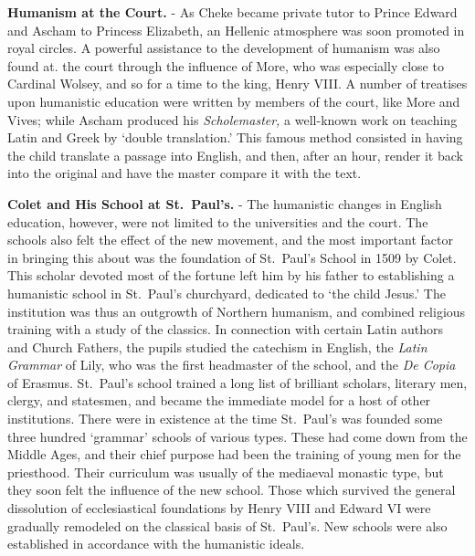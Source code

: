 \documentclass[
]{book}
\begin{document}
\textbf{Humanism at the Court.} - As Cheke became private tutor to Prince Edward and Ascham to Princess Elizabeth, an Hellenic atmosphere was soon promoted in royal circles. A powerful assistance to the development of humanism was also found at. the court through the influence of More, who was especially close to Cardinal Wolsey, and so for a time to the king, Henry VIII. A number of treatises upon humanistic education were written by members of the court, like More and Vives; while Ascham produced his \emph{Scholemaster,} a well-known work on teaching Latin and Greek by `double translation.' This famous method consisted in having the child translate a passage into English, and then, after an hour, render it back into the original and have the master compare it with the text.

\textbf{Colet and His School at St.~Paul's.} - The humanistic changes in English education, however, were not limited to the universities and the court. The schools also felt the effect of the new movement, and the most important factor in bringing this about was the foundation of St.~Paul's School in 1509 by Colet. This scholar devoted most of the fortune left him by his father to establishing a humanistic school in St.~Paul's churchyard, dedicated to `the child Jesus.' The institution was thus an outgrowth of Northern humanism, and combined religious training with a study of the classics. In connection with certain Latin authors and Church Fathers, the pupils studied the catechism in English, the \emph{Latin Grammar} of Lily, who was the first headmaster of the school, and the \emph{De Copia} of Erasmus. St.~Paul's school trained a long list of brilliant scholars, literary men, clergy, and statesmen, and became the immediate model for a host of other institutions. There were in existence at the time St.~Paul's was founded some three hundred `grammar' schools of various types. These had come down from the Middle Ages, and their chief purpose had been the training of young men for the priesthood. Their curriculum was usually of the mediaeval monastic type, but they soon felt the influence of the new school. Those which survived the general dissolution of ecclesiastical foundations by Henry VIII and Edward VI were gradually remodeled on the classical basis of St.~Paul's. New schools were also established in accordance with the humanistic ideals.
\end{document}
